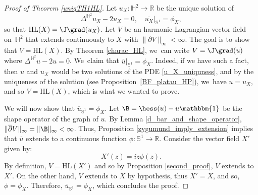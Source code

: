 \begin{proof}[Proof of Theorem \ref{uniqTH1HL}]
Let $u_X:\mathbb{H}^2\to\mathbb{R}$ be the unique solution of
\begin{equation}\label{u_X_uniquness}
\Delta^{\mathbb{H}^2} u_X-2u_X=0, \quad
\overline{u_X}|_{\mathbb{S}^1}=\phi_X,
\end{equation}
so that $\mathrm{HL}(X)=\J\grad(u_X)$.
Let $V$ be an harmonic Lagrangian vector field on~$\mathbb{H}^2$ that extends continuously to $X$ with $\lVert\overline{\partial}V\rVert_{\infty}\!<\! \infty$. The goal is to show that $V\!=\!\mathrm{HL}(X)$. By Theorem \ref{charac_HL}, we~can write $V=\J\grad(u)$ where $\Delta^{\mathbb{H}^2}u-2u=0$. We~claim that $\overline{u}|_{\mathbb{S}^1}=\phi_X$. Indeed, if we have such a fact, then $u$ and $u_X$ would be two solutions of the PDE \eqref{u_X_uniquness}, and by the uniqueness of the solution (see Proposition~\ref{BF_platau_HP}), we~have $u=u_X$, and so $V=\mathrm{HL}(X)$, which is what we wanted to prove.

We will now show that $\overline{u}_{\mathbb{S}^1}=\phi_X$. Let $\B=\hess(u)-u\mathbbm{1}$ be the shape operator of the graph of $u$. By Lemma \ref{d_bar_and_shape_operator}, $\lVert\overline{\partial} V\rVert_{\infty}=\lVert \B\rVert_{\infty}<\infty$. Thus, Proposition \ref{zygumund_imply_extension} implies that $\overline{u}$ extends to a continuous function $\phi:\mathbb{S}^1\to\mathbb{R}$. Consider the vector field $X'$ given by:
\[
X'(z)=iz\phi(z).
\]
By definition, $V=\mathrm{HL}(X')$ and so by Proposition \ref{second_proof}, $V$ extends to $X'$. On the other hand, $V$ extends to $X$ by hypothesis, thus $X'=X$, and so, $\phi=\phi_X$. Therefore, $\overline{u}_{\mathbb{S}^1}=\phi_X$, which concludes the proof.
\end{proof}

